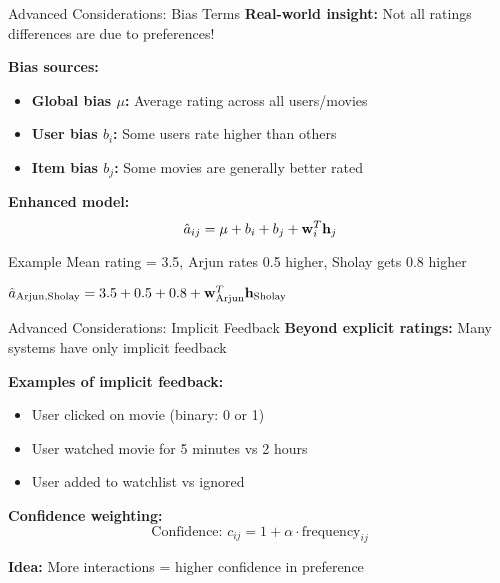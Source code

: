 \documentclass{beamer}
\begin{document}
\begin{frame}{Advanced Considerations: Bias Terms}
\textbf{Real-world insight:} Not all ratings differences are due to preferences!

\pause
\textbf{Bias sources:}
\begin{itemize}[<+->]
    \item \textbf{Global bias $\mu$:} Average rating across all users/movies
    \item \textbf{User bias $b_i$:} Some users rate higher than others
    \item \textbf{Item bias $b_j$:} Some movies are generally better rated
\end{itemize}

\pause
\textbf{Enhanced model:}
\begin{equation*}
\hat{a}_{ij} = \mu + b_i + b_j + \mathbf{w}_i^T \mathbf{h}_j
\end{equation*}

\pause
\begin{examplebox}{Example}
Mean rating = 3.5, Arjun rates 0.5 higher, Sholay gets 0.8 higher

$\hat{a}_{\text{Arjun,Sholay}} = 3.5 + 0.5 + 0.8 + \mathbf{w}_{\text{Arjun}}^T \mathbf{h}_{\text{Sholay}}$
\end{examplebox}
\end{frame}

\begin{frame}{Advanced Considerations: Implicit Feedback}
\textbf{Beyond explicit ratings:} Many systems have only implicit feedback

\pause
\textbf{Examples of implicit feedback:}
\begin{itemize}[<+->]
    \item User clicked on movie (binary: 0 or 1)
    \item User watched movie for 5 minutes vs 2 hours
    \item User added to watchlist vs ignored
\end{itemize}

\pause
\textbf{Confidence weighting:}
\begin{equation*}
\text{Confidence: } c_{ij} = 1 + \alpha \cdot \text{frequency}_{ij}
\end{equation*}

\pause
\begin{keypointsbox}{}
\textbf{Idea:} More interactions = higher confidence in preference
\end{keypointsbox}
\end{frame}
\end{document}
